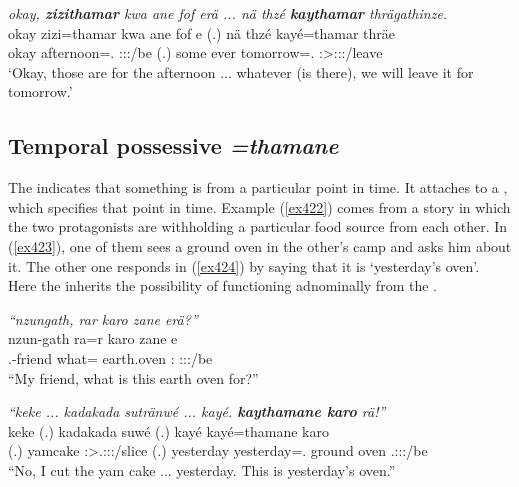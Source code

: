 \begin{exe}
	\ex \emph{okay, \textbf{zizithamar} kwa ane fof erä ... nä thzé \textbf{kaythamar} thrägathinze.}\\
	\gll okay zizi=thamar kwa ane fof e (.) nä thzé kayé=thamar thräe\\
	okay afternoon=\Temp.{\Purp} {\Fut} {\Dem} {\Emph} \Stpl:\Sbj:\Nonpast:\Ipfv/be (.) some ever tomorrow=\Temp.{\Purp} \Fpl:\Sbj>\Stpl:\Obj:\Irr:\Pfv/leave\\
	\trans `Okay, those are for the afternoon ... whatever (is there), we will leave it for tomorrow.'
	\label{ex421}
\end{exe}

\subsection{Temporal possessive \emph{=thamane}} \label{temporalpossessivecase}

The    indicates that something is from a particular point in time. It attaches to a  , which specifies that point in time. Example (\ref{ex422}) comes from a story in which the two protagonists are withholding a particular food source from each other. In (\ref{ex423}), one of them sees a ground oven in the other's camp and asks him about it. The other one responds in (\ref{ex424}) by saying that it is `yesterday's oven'. Here the   inherits the possibility of functioning adnominally from the  .

\begin{exe}
\ex \label{ex422}
\begin{xlist}
	\ex \emph{``nzungath, rar karo zane erä?''}\\
	\gll nzun-gath ra=r {karo} zane e\\
	\Fsg.\Poss-friend what={\Purp} {earth.oven} \Dem:{\Prox} \Stpl:\Sbj:\Nonpast:\Ipfv/be\\
	\trans ``My friend, what is this earth oven for?''
	\label{ex423}

	\ex \emph{``keke ... kadakada sutränwé ... kayé. \textbf{kaythamane karo} rä!''}\\
	\gll keke (.) {kadakada} suwé (.) kayé kayé=thamane karo \\
	{\Neg} (.) {yamcake} \Fsg:\Sbj>\Tsg.\Masc:\Obj:\Rpst:\Ipfv/slice (.) yesterday yesterday=\Temp.{\Poss} {ground oven} \Tsg.\F:\Sbj:\Nonpast:\Ipfv/be\\
	\trans ``No, I cut the yam cake ... yesterday. This is yesterday's oven.''\\
	\label{ex424}
\end{xlist}
\end{exe}
	

